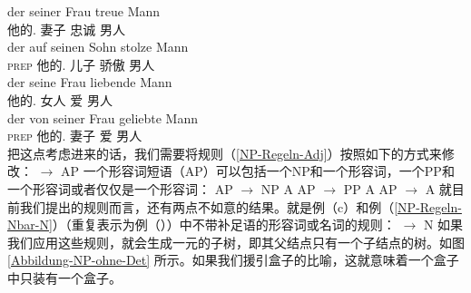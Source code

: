 \largerpage
\eal
\ex 
\gll der seiner Frau treue Mann\\
	  他的.\dat{} 妻子 忠诚 男人\\
\ex 
\gll der auf seinen Sohn stolze Mann\\
	  \textsc{prep} 他的.\acc{} 儿子 骄傲 男人\\
\ex 
\gll der seine Frau liebende Mann\\
	  他的.\acc{} 女人 爱 男人\\
\ex 
\gll der von seiner Frau geliebte Mann\\
      \textsc{prep} 他的.\dat{} 妻子 爱 男人\\
\zl
把这点考虑进来的话，我们需要将规则（\ref{NP-Regeln-Adj}）按照如下的方式来修改：
\ea
\label{NP-Regeln-AP} 
\nbar $\to$ AP \nbar
\z
一个形容词短语（AP）可以包括一个NP和一个形容词，一个PP和一个形容词或者仅仅是一个形容词：
\eal
\ex AP $\to$ NP A
\ex AP $\to$ PP A
\ex AP $\to$ A
\zl
就目前我们提出的规则而言，还有两点不如意的结果。就是例（c）和例（\ref{NP-Regeln-Nbar-N}）（重复表示为例（））中不带补足语的形容词或名词的规则：
\ea
\nbar $\to$ N
\z
如果我们应用这些规则，就会生成一元的子树，即其父结点只有一个子结点的树。如图\ref{Abbildung-NP-ohne-Det} 所示。如果我们援引盒子的比喻，这就意味着一个盒子中只装有一个盒子。

